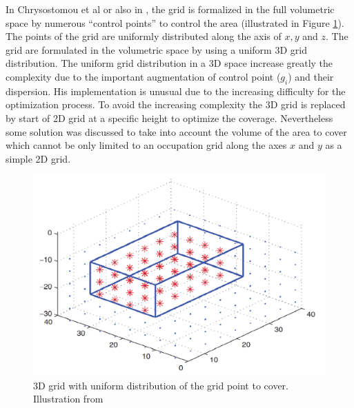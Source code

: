 In Chrysostomou et al \cite{82*chrysostomou2012} or also in \cite{226*nazarzehi2018}, the grid is formalized in the full volumetric space by numerous “control points” to control the area (illustrated in Figure \ref{fig:3Dgridfrom226}). The points of the grid are uniformly distributed along the axis of $x, y$ and $z$. The grid are formulated in the volumetric space by using a uniform 3D grid distribution.
The uniform grid distribution in a 3D space increase greatly the complexity  due to the important augmentation of control point ($g_i$) and their dispersion. His implementation is unusual due to the increasing difficulty for the optimization process. 
To avoid the increasing complexity the 3D grid is replaced by start of  2D grid at a specific height to optimize the coverage. 
Nevertheless some solution was discussed \citep{141*akbarzadeh2013,83*van2009} to take into account the volume of the area to cover which cannot be only limited to an occupation grid along the axes $ x $ and $ y $ as a simple 2D grid.
\begin{figure}[t!]
\begin{center}
   \includegraphics[width=\linewidth]{img/3DgridFrom226.png}
  \caption{3D grid with uniform distribution of the grid point to cover. Illustration from \cite{226*nazarzehi2018} }\label{fig:3Dgridfrom226}
  \endminipage\hfill
  \end{center}
\end{figure}

